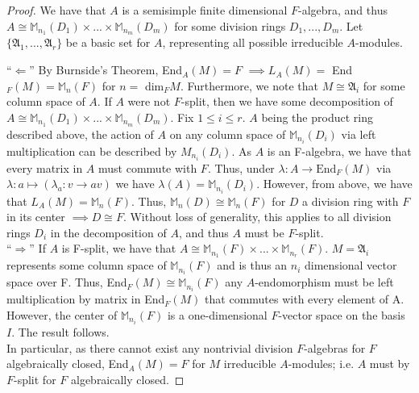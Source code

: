 \documentclass{article}
\begin{document}
\begin{proof}
  We have that $A$ is a semisimple finite dimensional $F$-algebra, and thus $A \cong \mathbb{M}_{n_{1}}(D_{1}) \times ... \times \mathbb{M}_{n_{m}}(D_{m})$ for some division rings $D_{1},...,D_{m}$. Let $\{\mathfrak{A}_{1},..., \mathfrak{A}_{r}\}$ be a basic set for $A$, representing all possible irreducible $A$-modules. \newline


  ``$\Leftarrow$'' By Burnside's Theorem, End$_{A}(M) = F$ $\implies L_{A}(M) =$ End$_{F}(M) = \mathbb{M}_{n}(F)$ for $n =$ dim$_{F}M$. Furthermore, we note that $M \cong \mathfrak{A}_{i}$ for some column space of $A$. If $A$ were not $F$-split, then we have some decomposition of $A \cong \mathbb{M}_{n_{1}}(D_{1}) \times ... \times \mathbb{M}_{n_{m}}(D_{m})$. Fix $1\leq i \leq r$. $A$ being the product ring described above, the action of $A$ on any column space of $\mathbb{M}_{n_{i}}(D_{i})$ via left multiplication can be described by $M_{n_{i}}(D_{i})$. As $A$ is an F-algebra, we have that every matrix in $A$ must commute with $F$. Thus, under $\lambda: A \to \text{End}_{F}(M)$ via $\lambda: a \mapsto (\lambda_{a}: v \to av)$ we have $\lambda(A) = \mathbb{M}_{n_{i}}(D_{i})$. However, from above, we have that $L_{A}(M) = \mathbb{M}_{n}(F)$. Thus, $\mathbb{M}_{n}(D) \cong \mathbb{M}_{n}(F)$ for $D$ a division ring with $F$ in its center $\implies D \cong F$. Without loss of generality, this applies to all division rings $D_{i}$ in the decomposition of $A$, and thus $A$ must be $F$-split. \\

  ``$\Rightarrow$'' If $A$ is F-split, we have that $A \cong \mathbb{M}_{n_{1}}(F) \times ... \times \mathbb{M}_{n_{r}}(F)$. $M = \mathfrak{A}_{i}$ represents some column space of $\mathbb{M}_{n_{i}}(F)$ and is thus an $n_{i}$ dimensional vector space over F. Thus, End$_{F}(M) \cong \mathbb{M}_{n_{i}}(F)$ any $A$-endomorphism must be left multiplication by matrix in End$_{F}(M)$ that commutes with every element of A. However, the center of $\mathbb{M}_{n_{i}}(F)$ is a one-dimensional $F$-vector space on the basis $I$. The result follows. \\

  In particular, as there cannot exist any nontrivial division $F$-algebras for $F$ algebraically closed, End$_{A}(M) = F$ for $M$ irreducible $A$-modules; i.e. $A$ must by $F$-split for $F$ algebraically closed. \end{proof}

\pagebreak
\end{document}
